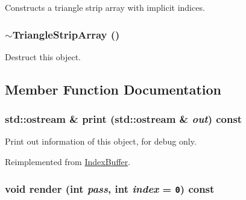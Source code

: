 Constructs a triangle strip array with implicit indices. \hypertarget{classm3g_1_1TriangleStripArray_1cb3853bf79b7710d57044da818d2cde}{
\subsubsection[{$\sim$TriangleStripArray}]{\setlength{\rightskip}{0pt plus 5cm}$\sim${\bf TriangleStripArray} ()}}
\label{classm3g_1_1TriangleStripArray_1cb3853bf79b7710d57044da818d2cde}


Destruct this object. 

\subsection{Member Function Documentation}
\hypertarget{classm3g_1_1TriangleStripArray_6fea17fa1532df3794f8cb39cb4f911f}{
\subsubsection[{print}]{\setlength{\rightskip}{0pt plus 5cm}std::ostream \& print (std::ostream \& {\em out}) const}}
\label{classm3g_1_1TriangleStripArray_6fea17fa1532df3794f8cb39cb4f911f}


Print out information of this object, for debug only. 

Reimplemented from \hyperlink{classm3g_1_1IndexBuffer_6fea17fa1532df3794f8cb39cb4f911f}{IndexBuffer}.\hypertarget{classm3g_1_1TriangleStripArray_1efcb1973989d9963d5bd6d03065d389}{
\subsubsection[{render}]{\setlength{\rightskip}{0pt plus 5cm}void render (int {\em pass}, \/  int {\em index} = {\tt 0}) const}}
\label{classm3g_1_1TriangleStripArray_1efcb1973989d9963d5bd6d03065d389}



